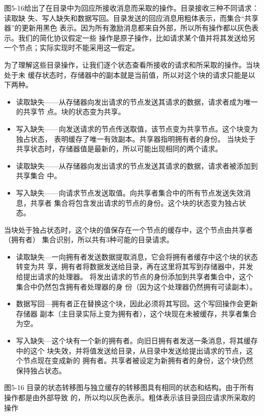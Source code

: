 图5-16给出了在目录中为回应所接收消息而采取的操作。目录接收三种不同请求：读取缺
失、写人缺失和数据写回。目录发送的回应消息用粗体表示，而集合“共享器”的更新用黑色
表示。因为所有激励消息都来自外部，所以所有操作都以灰色表示。我们的简化协议假定一些
操作是原子操作，比如请求某个值并将其发送给另一个节点；实际实现时不能采用这一假定。

为了理解这些目录操作，让我们逐个状态查看所接收的请求和所采取的操作。当块处于未
缓存状态时，存储器中的副本就是当前值，所以对这个块的请求只能是以下两种。

\begin{itemize}
    \item 读取缺失——从存储器向发出请求的节点发送其请求的数据，请求者成为唯一的共享节
    点。块的状态变为共享。
    \item 写入缺失——向发送请求的节点传送取值，该节点变为共享节点。这个块变为独占状态，
    表明缓存了唯一有效副本。共享器指明拥有者的身份。
    当块处于共享状态时，存储器值是最新的，所以可能出现相同的两个请求。
    \item 读取缺失——从存储器向发出请求的节点发送其请求的数据，请求者被添加到共享集合
    中。
    \item 写入缺失——向请求节点发送取值。向共享者集合中的所有节点发送失效消息，共享者
    集合将包含发出请求的节点的身份。这个块的状态变为独占状态。
\end{itemize}

当块处于独占状态时，这个块的值保存在一个节点的缓存中，这个节点由共享者（拥有者）
集合识别，所以共有3种可能的目录请求。

\begin{itemize}
    \item 读取缺失—一向拥有者发送数据提取消息，它会将拥有者缓存中这个块的状态转变为共
    享，拥有者将数据发送给目录，再在这里将其写到存储器中，并发给提出请求的处理器。
    将发出请求的节点的身份添加到共享者集合中，这个集合中仍然包含拥有者处理器的身
    份（因为这个处理器仍然拥有可读副本）。
    \item 数据写回—拥有者正在替换这个块，因此必须将其写回。这个写回操作会更新存储器
    副本（主目录实际上变为拥有者），这个块现在未被缓存，共享者集合为空。
    \item 写入缺失—这个块有一个新的拥有者。向旧日拥有者发送一条消息，将其缓存中的这个
    块失效，并将值发送给目录，从目录中发送给提出请求的节点，这个节点现在变成新的
    拥有者。共享者被设定为新拥有者的身份，这个块仍然保持独占状态。
\end{itemize}

图5-16 目录的状态转移图与独立缓存的转移图具有相同的状态和结构。由于所有操作都是由外部导致
的，所以均以灰色表示。粗体表示该目录回应请求所采取的操作

